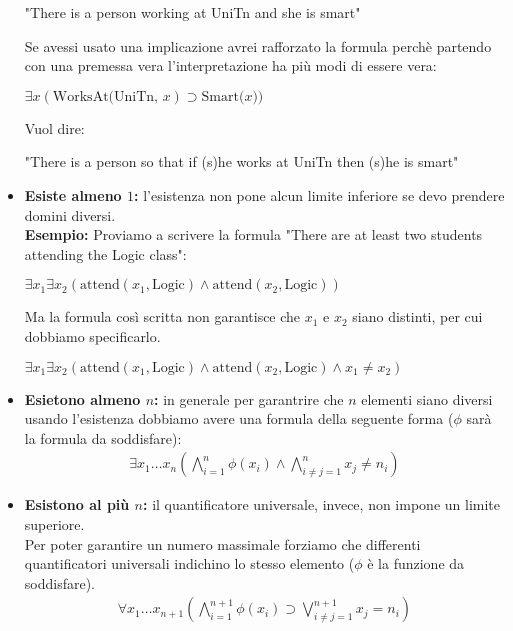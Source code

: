 \documentclass[../main.tex]{subfiles}
\begin{document}
\begin{itemize}
\begin{center}
            "There is a person working at UniTn and she is smart"
         \end{center}
         Se avessi usato una implicazione avrei rafforzato la formula perchè partendo con una premessa vera l'interpretazione ha più modi di essere vera:
         \begin{center}
            $\exists x(\text{WorksAt(UniTn, }x) \supset \text{Smart(}x))$
         \end{center}
         Vuol dire:
         \begin{center}
            "There is a person so that if (s)he works at UniTn then (s)he is smart"
         \end{center}
      \item \textbf{Esiste almeno $1$:} l'esistenza non pone alcun limite inferiore se devo prendere domini diversi.\\
         \textbf{Esempio:} Proviamo a scrivere la formula "There are at least two students attending the Logic class":
         \begin{center}
            $\exists x_1 \exists x_2( \text{attend}(x_1,\text{Logic}) \land \text{attend}(x_2,\text{Logic}))$
         \end{center}
         Ma la formula così scritta non garantisce che $x_1$ e $x_2$ siano distinti, per cui dobbiamo specificarlo.
         \begin{center}
            $\exists x_1 \exists x_2( \text{attend}(x_1,\text{Logic}) \land \text{attend}(x_2,\text{Logic}) \land x_1 \neq x_2)$
         \end{center}  
      \item \textbf{Esietono almeno $n$:} in generale per garantrire che $n$ elementi siano diversi usando l'esistenza dobbiamo avere una formula della seguente forma ($\phi$ sarà la formula da soddisfare):
         \begin{gather*}
            \exists x_1 \dots x_n (\bigwedge^{n}_{i=1}{\phi (x_i)} \land \bigwedge^{n}_{i \neq j=1}{x_j \neq n_i})
         \end{gather*}
      \item \textbf{Esistono al più $n$:} il quantificatore universale, invece, non impone un limite superiore.\\
         Per poter garantire un numero massimale forziamo che differenti quantificatori universali indichino lo stesso elemento ($\phi$ è la funzione da soddisfare).
         \begin{gather*}
            \forall x_1 \dots x_{n+1} (\bigwedge^{n+1}_{i=1}{\phi (x_i)} \supset \bigvee^{n+1}_{i \neq j=1}{x_j = n_i})
         \end{gather*}
   \end{itemize}
\end{document}

